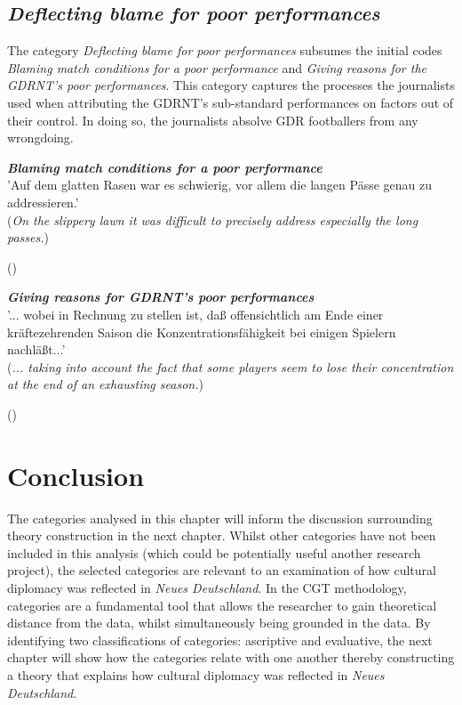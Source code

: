 \subsection*{\textit{Deflecting blame for poor performances}}

The category \textit{Deflecting blame for poor performances} subsumes the initial codes \textit{Blaming match conditions for a poor performance} and \textit{Giving reasons for the GDRNT’s poor performances}. This category captures the processes the journalists used when attributing the GDRNT’s sub-standard performances on factors out of their control. In doing so, the journalists absolve GDR footballers from any wrongdoing.

\begin{displayquote}
\begin{small}
\textbf{\textit{Blaming match conditions for a poor performance}}\\
'Auf dem glatten Rasen war es schwierig, vor allem die langen Pässe genau zu addressieren.'\\
(\textit{On the slippery lawn it was difficult to precisely address especially the long passes.})\
\begin{flushright}\footnotesize (\cite{nd19740619})\end{flushright}
\end{small}
\end{displayquote}

\begin{displayquote}
\begin{small}
\textbf{\textit{Giving reasons for GDRNT’s poor performances}}\\
'... wobei in Rechnung zu stellen ist, daß offensichtlich am Ende einer kräftezehrenden Saison die Konzentrationsfähigkeit bei einigen Spielern nachläßt...'\\
(\textit{... taking into account the fact that some players seem to lose their concentration at the end of an exhausting season.})\
\begin{flushright}\footnotesize (\cite{nd19740328})\end{flushright}
\end{small}
\end{displayquote}

\section*{Conclusion}

The categories analysed in this chapter will inform the discussion surrounding theory construction in the next chapter. Whilst other categories have not been included in this analysis (which could be potentially useful another research project), the selected categories are relevant to an examination of how cultural diplomacy was reflected in \textit{Neues Deutschland}. In the CGT methodology, categories are a fundamental tool that allows the researcher to gain theoretical distance from the data, whilst simultaneously being grounded in the data. By identifying two classifications of categories: ascriptive and evaluative, the next chapter will show how the categories relate with one another thereby constructing a theory that explains how cultural diplomacy was reflected in \textit{Neues Deutschland}. 